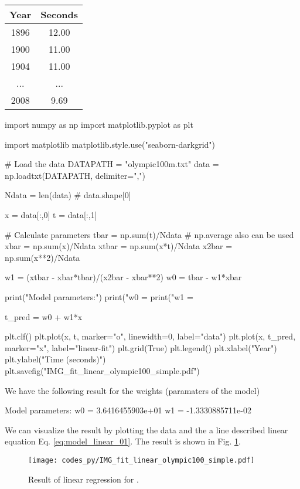 \begin{table}[h]
\begin{center}
\begin{tabular}{|c|c|}
\hline
Year & Seconds \\
\hline
1896 & 12.00 \\
1900 & 11.00 \\
1904 & 11.00 \\
...  & ...   \\
2008 & 9.69  \\
\hline
\end{tabular}
\end{center}
\end{table}


\begin{pythoncode}
import numpy as np
import matplotlib.pyplot as plt
  
import matplotlib
matplotlib.style.use("seaborn-darkgrid")
  
# Load the data
DATAPATH = "olympic100m.txt"
data = np.loadtxt(DATAPATH, delimiter=",")
  
Ndata = len(data) # data.shape[0]
  
x = data[:,0]
t = data[:,1]
  
# Calculate parameters
tbar = np.sum(t)/Ndata # np.average also can be used
xbar = np.sum(x)/Ndata
xtbar = np.sum(x*t)/Ndata
x2bar = np.sum(x**2)/Ndata
  
w1 = (xtbar - xbar*tbar)/(x2bar - xbar**2)
w0 = tbar - w1*xbar
  
print("Model parameters:")
print("w0 = %
print("w1 = %
  
t_pred = w0 + w1*x
  
plt.clf()
plt.plot(x, t, marker="o", linewidth=0, label="data")
plt.plot(x, t_pred, marker="x", label="linear-fit")
plt.grid(True)
plt.legend()
plt.xlabel("Year")
plt.ylabel("Time (seconds)")
plt.savefig("IMG_fit_linear_olympic100_simple.pdf")  
\end{pythoncode}

We have the following result for the weights (paramaters of the model)
\begin{textcode}
Model parameters:
w0 =   3.6416455903e+01
w1 =  -1.3330885711e-02
\end{textcode}

We can visualize the result by plotting the data and the a line described
linear equation Eq. \eqref{eq:model_linear_01}. The result is shown in
Fig. \ref{fig:linreg_01}.
\begin{figure}[h]
\begin{center}
\texttt{[image: codes\_py/IMG\_fit\_linear\_olympic100\_simple.pdf]}
\end{center}
\caption{Result of linear regression for .}
\label{fig:linreg_01}
\end{figure}


